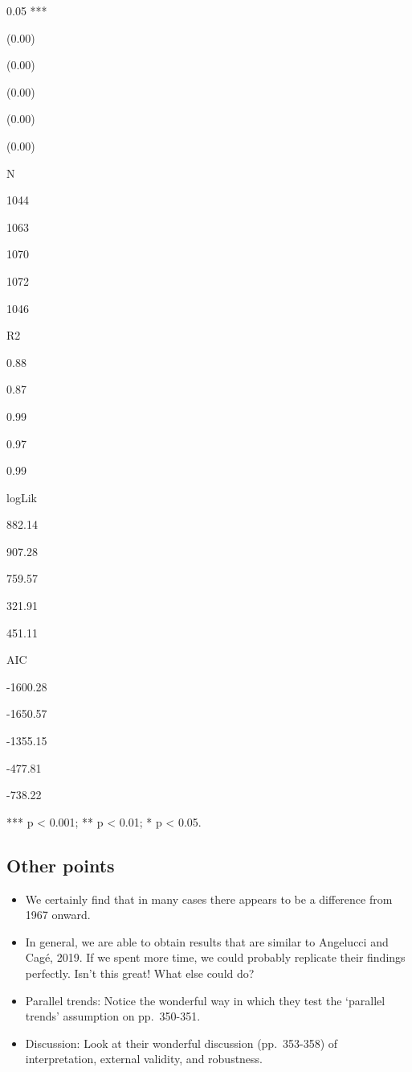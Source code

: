 \documentclass[
]{book}
\providecommand{\tightlist}{%
  \setlength{\itemsep}{0pt}\setlength{\parskip}{0pt}}
\begin{document}
0.05 ***

(0.00)~~~

(0.00)~~~

(0.00)~~~

(0.00)~~~

(0.00)~~~

N

1044~~~~~~~

1063~~~~~~~

1070~~~~~~~

1072~~~~~~~

1046~~~~~~~

R2

0.88~~~~

0.87~~~~

0.99~~~~

0.97~~~~

0.99~~~~

logLik

882.14~~~~

907.28~~~~

759.57~~~~

321.91~~~~

451.11~~~~

AIC

-1600.28~~~~

-1650.57~~~~

-1355.15~~~~

-477.81~~~~

-738.22~~~~

*** p \textless{} 0.001; ** p \textless{} 0.01; * p \textless{} 0.05.

\hypertarget{other-points}{%
\subsection{Other points}\label{other-points}}

\begin{itemize}
\tightlist
\item
  We certainly find that in many cases there appears to be a difference from 1967 onward.
\item
  In general, we are able to obtain results that are similar to Angelucci and Cagé, 2019. If we spent more time, we could probably replicate their findings perfectly. Isn't this great! What else could do?
\item
  Parallel trends: Notice the wonderful way in which they test the `parallel trends' assumption on pp.~350-351.
\item
  Discussion: Look at their wonderful discussion (pp.~353-358) of interpretation, external validity, and robustness.
\end{itemize}
\end{document}
